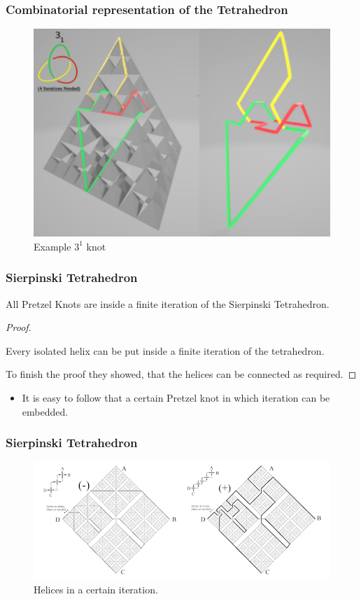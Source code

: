 \begin{frame}
	\frametitle{Combinatorial representation of the Tetrahedron} %
	\begin{figure}[h]
		\centering
		\includegraphics[width=0.5\linewidth]{images/CombRep3}
		\caption{Example $3^1$ knot \cite{broden2024knotsinsidefractals}}
		\label{fig:enter-label}
	\end{figure}
\end{frame}

\begin{frame}
	\frametitle{Sierpinski Tetrahedron} %
	\begin{theorem}
		All Pretzel Knots are inside a finite iteration of the Sierpinski Tetrahedron. \cite{broden2024knotsinsidefractals}
	\end{theorem}
	\begin{proof}
		\begin{lemma}
			Every isolated helix can be put inside a finite iteration of the tetrahedron. \cite{broden2024knotsinsidefractals}
		\end{lemma}
		To finish the proof they showed, that the helices can be connected as required.  
	\end{proof}
	\begin{itemize}
		\item It is easy to follow that a certain Pretzel knot in which iteration can be embedded.
	\end{itemize}
\end{frame}

\begin{frame}
	\frametitle{Sierpinski Tetrahedron}
	\begin{figure}[h]
		\centering
		\includegraphics[width=1.0\linewidth]{images/Helix1}
		\caption{Helices in a certain iteration. \cite{broden2024knotsinsidefractals}}\label{Fig:Helix1}
	\end{figure}
\end{frame}

